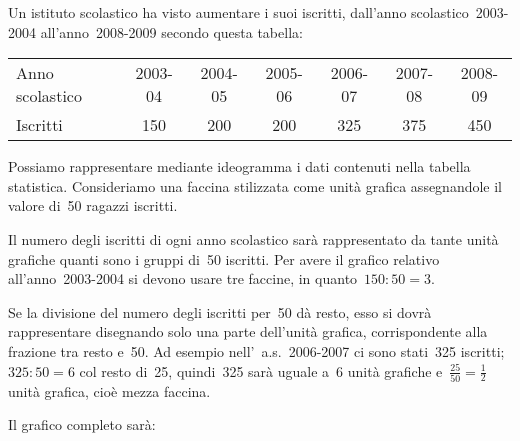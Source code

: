 \begin{esempio}
Un istituto scolastico ha visto aumentare i suoi iscritti, dall'anno 
scolastico~2003-2004 all'anno~2008-2009 secondo questa tabella:
\vspace{-6pt}

\begin{center}
 \begin{tabular}{lcccccc}
 \toprule
 Anno scolastico & 2003-04 & 2004-05 & 2005-06 & 2006-07 & 2007-08 & 
2008-09\\
 Iscritti & 150 & 200 & 200 & 325 & 375 & 450\\
 \bottomrule
\end{tabular}
\end{center}
\vspace{-6pt}

Possiamo rappresentare mediante ideogramma i dati contenuti nella tabella 
statistica.
Consideriamo una faccina stilizzata come unità grafica assegnandole il 
valore di~50 ragazzi iscritti.
\vspace{-6pt}
\begin{center}
 
\end{center}
\vspace{-6pt}
Il numero degli iscritti di ogni anno scolastico sarà rappresentato da 
tante unità grafiche quanti sono i gruppi di~50 iscritti.
Per avere il grafico relativo all'anno~2003-2004 si devono usare tre 
faccine, in quanto~\(150: 50 = 3\).
\vspace{-6pt}
\begin{center}
 
\end{center}
\vspace{-6pt}
Se la divisione del numero degli iscritti per~50 dà resto, esso si dovrà 
rappresentare disegnando solo una parte
dell'unità grafica, corrispondente alla frazione tra resto e~50. Ad esempio 
nell'~a.s.~2006-2007 ci sono stati~325 iscritti; \(325:50 = 6\)
col resto di~25, quindi~325 sarà uguale a~6 unità grafiche 
e~\(\frac{25}{50}=\frac{1}{2}\) unità grafica, cioè mezza faccina.
\vspace{-6pt}
\begin{center}
 
\end{center}
\vspace{-6pt}
Il grafico completo sarà:
\begin{center}
 
\end{center}
 \end{esempio}

